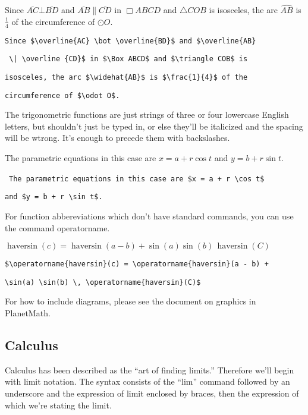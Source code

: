 \medskip

Since $\overline{AC} \bot \overline{BD}$ and $\overline{AB} \| \overline {CD}$ in $\Box ABCD$ and $\triangle COB$ is isosceles, the arc $\widehat{AB}$ is $\frac{1}{4}$ of the circumference of $\odot O$.

\smallskip

\verb"Since $\overline{AC} \bot \overline{BD}$ and $\overline{AB}"

\verb" \| \overline {CD}$ in $\Box ABCD$ and $\triangle COB$ is" 

\verb"isosceles, the arc $\widehat{AB}$ is $\frac{1}{4}$ of the" 

\verb"circumference of $\odot O$."

\bigskip

The trigonometric functions are just strings of three or four lowercase English letters, but shouldn't just be typed in, or else they'll be italicized and the spacing will be wtrong. It's enough to precede them with backslashes.

\medskip

The parametric equations in this case are $x = a + r \cos t$ and $y = b + r \sin t$.

\smallskip
\
\verb'The parametric equations in this case are $x = a + r \cos t$'

\verb'and $y = b + r \sin t$.'

\bigskip

For function abbereviations which don't have standard commands, you can use the command operatorname.

\medskip

$\operatorname{haversin}(c) = \operatorname{haversin}(a - b) + \sin(a) \sin(b) \, \operatorname{haversin}(C)$

\smallskip

\verb"$\operatorname{haversin}(c) = \operatorname{haversin}(a - b) +" 

\verb"\sin(a) \sin(b) \, \operatorname{haversin}(C)$"

\bigskip

For how to include diagrams, please see the document on graphics in PlanetMath.

\subsection{Calculus}

Calculus has been described as the ``art of finding limits.'' Therefore we'll begin with limit notation. The syntax consists of the ``lim'' command followed by an underscore and the expression of limit enclosed by braces, then the expression of which we're stating the limit.

